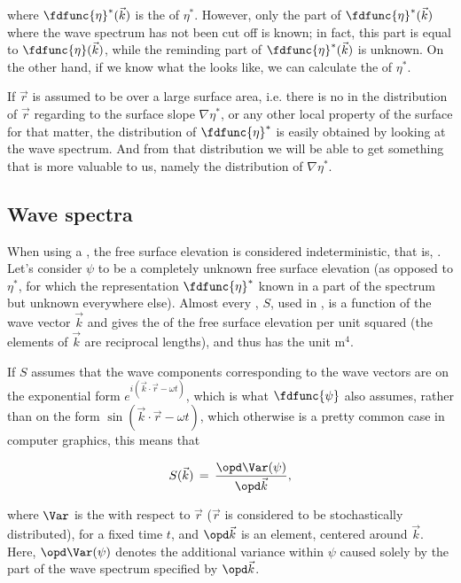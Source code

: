 where $\fdfunc{\eta}^*(\vec{k})$ is the  of $\eta^*$. However, only the part of $\fdfunc{\eta}^*(\vec{k})$ where the wave spectrum has not been cut off is known; in fact, this part is equal to $\fdfunc{\eta}(\vec{k})$, while the reminding part of $\fdfunc{\eta}^*(\vec{k})$ is unknown. On the other hand, if we know what the  looks like, we can calculate the  of $\eta^*$.

If $\vec{r}$ is assumed to be  over a large surface area, i.e. there is no \bias in the distribution of $\vec{r}$ regarding to the surface slope $\nabla\eta^*$, or any other local property of the surface for that matter, the distribution of $\fdfunc{\eta}^*$ is easily obtained by looking at the wave spectrum. And from that distribution we will be able to get something that is more valuable to us, namely the distribution of $\nabla\eta^*$.

\subsection{Wave spectra}

When using a , the free surface elevation is considered indeterministic, that is, \stochastic. Let's consider $\psi$ to be a completely unknown free surface elevation (as opposed to $\eta^*$, for which the  representation $\fdfunc{\eta}^*$ known in a part of the spectrum but unknown everywhere else). Almost every , $S$, used in , is a function of the wave vector $\vec{k}$ and gives the \variance of the free surface elevation per unit  squared (the elements of $\vec{k}$ are reciprocal lengths), and thus has the unit $\text{m}^4$. 

If $S$ assumes that the wave components corresponding to the wave vectors are on the exponential form $e^{i(\vec{k}\cdot\vec{r}-\omega t)}$, which is what $\fdfunc{\psi}$ also assumes, rather than on the \sinusoidal form $\sin(\vec{k}\cdot\vec{r}-\omega t)$, which otherwise is a pretty common case in computer graphics, this means that

\begin{equation} \label{eq:wave_spectrum_definition}
S(\vec{k}) \,=\, \frac{\opd \Var(\psi)}{\opd\vec{k}},
\end{equation}

where $\Var$ is the  with respect to $\vec{r}$ ($\vec{r}$ is considered to be stochastically distributed), for a fixed time $t$, and $\opd\vec{k}$ is an \infinitesimal {} element, centered around $\vec{k}$. Here, $\opd\Var(\psi)$ denotes the additional variance within $\psi$ caused solely by the part of the wave spectrum specified by $\opd\vec{k}$.

